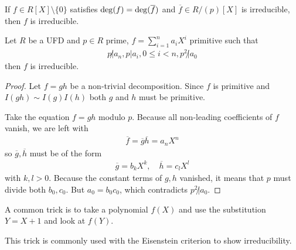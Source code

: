 \begin{prop}[]
  If $f \in R[X] \setminus \{0\}$ satisfies $\operatorname{deg}(f) = \operatorname{deg}(\overline{f})$ and $\overline{f} \in R/(p)[X]$ is irreducible, then $f$ is irreducible.
\end{prop}


\begin{thm}
  Let $R$ be a UFD and $p \in R$ prime, $f = \sum_{i=1}^{n}a_i X^{i}$ primitive such that
  \begin{align*}
    p\not|a_n, p|a_i, 0 \leq i < n, p^{2} \not|a_0
  \end{align*}
  then $f$ is irreducible.
\end{thm}
\begin{proof}
Let $f = gh$ be a non-trivial decomposition.
Since $f$ is primitive and $I(gh) \sim I(g)I(h)$ both $g$ and $h$ must be primitive.

Take the equation $f = gh$ modulo $p$.
Because all non-leading coefficients of $f$ vanish, we are left with
\begin{align*}
  \overline{f} = \overline{g} \overline{h} = a_n X^{n}
\end{align*}
so $\overline{g},\overline{h}$ must be of the form
\begin{align*}
  \overline{g} = b_k X^{k}, \quad \overline{h} = c_l X^{l}
\end{align*}
with $k,l > 0$.
Because the constant terms of $g,h$ vanished, it means that $p$ must divide both $b_0,c_0$.
But $a_0 = b_0 c_0$, which contradicts $p^{2} \not | a_0$.
\end{proof}


A common trick is to take a polynomial $f(X)$ and use the substitution $Y = X + 1$ and look at $f(Y)$.

This trick is commonly used with the Eisenstein criterion to show irreducibility.


